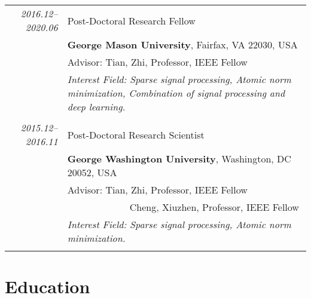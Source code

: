 \documentclass[paper=a4,fontsize=11pt]{scrartcl}
\begin{document}
\begin{tabular}{r|p{12cm}}
\emph{2016.12--2020.06} & Post-Doctoral Research Fellow\\
& \normalsize\textbf{George Mason University}, Fairfax, VA 22030, USA\\
& Advisor: Tian, Zhi, Professor, IEEE Fellow \\
& \emph{Interest Field: Sparse signal processing, Atomic norm minimization, Combination of signal processing and deep learning.} \\
	\multicolumn{2}{c}{} \\


  \emph{2015.12--2016.11} & Post-Doctoral Research Scientist\\
  & \normalsize\textbf{George Washington University}, Washington, DC 20052, USA\\
  & Advisor: Tian, Zhi, Professor, IEEE Fellow \\
  & ~~~~~~~~~~~~~Cheng, Xiuzhen, Professor, IEEE Fellow \\
  & \emph{Interest Field: Sparse signal processing, Atomic norm minimization.}\\
  \multicolumn{2}{c}{}

%
	

\end{tabular}

\section*{Education}
\end{document}
